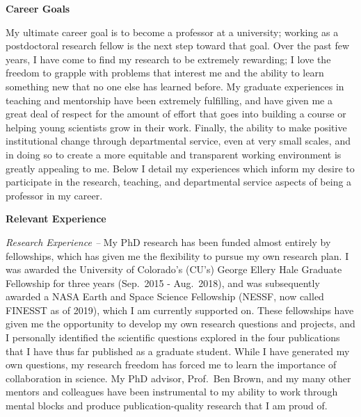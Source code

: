 \documentclass[onecolumn, 11pt, hmargin=1in, vmargin=1in]{aastex62}
\begin{document}
\thispagestyle{fancy}
\begin{center}
\vspace{-1.4in}
\textbf{Career Goals}
\vspace{-6pt}
\end{center}
My ultimate career goal is to become a professor at a university; working as a postdoctoral research fellow is the next step toward that goal.
Over the past few years, I have come to find my research to be extremely rewarding; I love the freedom to grapple with problems that interest me and the ability to learn something new that no one else has learned before.
My graduate experiences in teaching and mentorship have been extremely fulfilling, and have given me a great deal of respect for the amount of effort that goes into building a course or helping young scientists grow in their work.
Finally, the ability to make positive institutional change through departmental service, even at very small scales, and in doing so to create a more equitable and transparent working environment is greatly appealing to me.
Below I detail my experiences which inform my desire to participate in the research, teaching, and departmental service aspects of being a professor in my career.

\begin{center}
\textbf{Relevant Experience}
\vspace{-6pt}
\end{center}
\emph{Research Experience --}
My PhD research has been funded almost entirely by fellowships, which has given me the flexibility to pursue my own research plan.
I was awarded the University of Colorado's (CU's) George Ellery Hale Graduate Fellowship for three years (Sep.~2015 - Aug.~2018), and was subsequently awarded a NASA Earth and Space Science Fellowship (NESSF, now called FINESST as of 2019), which I am currently supported on.
These fellowships have given me the opportunity to develop my own research questions and projects, and I personally identified the scientific questions explored in the four publications that I have thus far published as a graduate student.
While I have generated my own questions, my research freedom has forced me to learn the importance of collaboration in science.
My PhD advisor, Prof.~Ben Brown, and my many other mentors and colleagues have been instrumental to my ability to work through mental blocks and produce publication-quality research that I am proud of.
\end{document}
